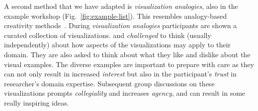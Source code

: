 A second method that we have adapted is \emph{visualization analogies}, also in the example workshop (Fig.~\ref{fig:example-list}). This resembles analogy-based creativity methods~\cite{Gordon1961}. During \emph{visualization analogies} participants are shown a curated collection of visualizations. and \emph{challenged} to think (usually independently) about how aspects of the visualizations may apply to their domain. They are also asked to think about what they like and dislike about the visual examples. The diverse examples are important to prepare with care as they can not only result in increased \emph{interest} but also in the participant's \emph{trust} in researcher's domain expertise. Subsequent group discussions on these visualizations prompts \emph{collegiality} and increases \emph{agency}, and can result in some really inspiring ideas. 

